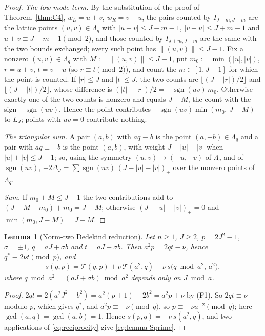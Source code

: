 \documentclass[11pt]{article}
\newtheorem{lemma}[theorem]{Lemma}
\theoremstyle{definition}
\DeclareMathOperator{\sgn}{sgn}
\begin{document}
\begin{proof}
\emph{The low-mode term.}  By the substitution of the proof of
Theorem~\ref{thm:C4}, $w_L=u+v$, $w_R=v-u$, the pairs counted by
$I_{J-m,J+m}$ are the lattice points $(u,v)\in\Lambda_q$ with
$|u+v|\leq J-m-1$, $|v-u|\leq J+m-1$ and $u+v\equiv J-m-1\pmod2$, and
those counted by $I_{J+m,J-m}$ are the same with the two bounds
exchanged; every such point has $\|(u,v)\|\leq J-1$.  Fix a nonzero
$(u,v)\in\Lambda_q$ with $M:=\|(u,v)\|\leq J-1$, put
$m_0:=\min(|u|,|v|)$, $r=u+v$, $t=v-u$ (so $r\equiv t\pmod2$), and
count the $m\in[1,J-1]$ for which the point is counted.  If $|r|\leq J$
and $|t|\leq J$, the two counts are $\lfloor(J-|r|)/2\rfloor$ and
$\lfloor(J-|t|)/2\rfloor$, whose difference is
$(|t|-|r|)/2=-\sgn(uv)\,m_0$.  Otherwise exactly one of the two counts
is nonzero and equals $J-M$, the count with the sign
$-\sgn(uv)$.  Hence the point contributes $-\sgn(uv)\min(m_0,\,J-M)$
to $L_J$; points with $uv=0$ contribute nothing.

\emph{The triangular sum.}  A pair $(a,b)$ with $aq\equiv b$ is the
point $(a,-b)\in\Lambda_q$ and a pair with $aq\equiv-b$ is the point
$(a,b)$, with weight $J-|u|-|v|$ when $|u|+|v|\leq J-1$; so, using the
symmetry $(u,v)\mapsto(-u,-v)$ of $\Lambda_q$ and of $\sgn(uv)$,
$-2\Delta_J=\sum\sgn(uv)\,(J-|u|-|v|)_+$ over the nonzero points of
$\Lambda_q$.

\emph{Sum.}  If $m_0+M\leq J-1$ the two contributions add to
$(J-M-m_0)+m_0=J-M$; otherwise $(J-|u|-|v|)_+=0$ and
$\min(m_0,J-M)=J-M$.
\end{proof}

\begin{lemma}[Norm-two Dedekind reduction]
\label{lem:Sprime}
Let $n\geq1$, $J\geq2$, $p=2J^2-1$, $\sigma=\pm1$, $q=aJ+\sigma b$ and
$t=aJ-\sigma b$.  Then $a^2p=2qt-\nu$, hence $q^*\equiv2\nu t\pmod p$, and
\begin{equation}
 s(q,p)=\mathcal T(q,p)+\nu\,\mathcal T(a^2,q)-\nu\,s\bigl(q\bmod a^2,\,a^2\bigr),
 \label{eq:lemma-Sprime}
\end{equation}
where $q\bmod a^2=(aJ+\sigma b)\bmod a^2$ depends only on $J\bmod a$.
\end{lemma}

\begin{proof}
$2qt=2(a^2J^2-b^2)=a^2(p+1)-2b^2=a^2p+\nu$ by (F1).  So $2qt\equiv\nu$
modulo $p$, which gives $q^*$, and $a^2p\equiv-\nu\pmod q$, so
$p\equiv-\nu a^{-2}\pmod q$; here $\gcd(a,q)=\gcd(a,b)=1$.  Hence
$s(p,q)=-\nu\,s(a^2,q)$, and two applications of
\eqref{eq:reciprocity} give \eqref{eq:lemma-Sprime}.
\end{proof}
\end{document}
